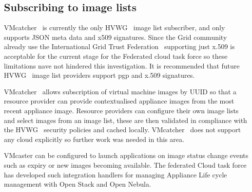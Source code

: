 \documentclass{llncs_Ibergrid2013}
\begin{document}
\subsection{Subscribing to image lists}
VMcatcher~\cite{vmcatcher} is currently the only HVWG~\cite{hepix} image list subscriber, and only supports JSON meta data and x509 signatures. Since the Grid community already use the International Grid Trust Federation~\cite{igtf} supporting just x.509 is acceptable for the current stage for the Federated cloud task force so these limitations nave not hindered this investigation. It is recommended that future HVWG~\cite{hepix} image list providers support pgp and x.509 signatures.

VMcatcher~\cite{vmcatcher} allows subscription of virtual machine images by UUID so that a resource provider can provide contextualised appliance images from the most recent appliance image. Resource providers can configure their own image lists and select images from an image list, these are then validated in compliance with the HVWG~\cite{hepix} security policies and cached locally. VMcatcher~\cite{vmcatcher} does not support any cloud explicitly so further work was needed in this area.

VMcaster can be configured to launch applications on image status change events such as expiry or new images becoming available. The federated Cloud task force has developed such integration handlers for managing Appliance Life cycle management with Open Stack and Open Nebula.
\end{document}
